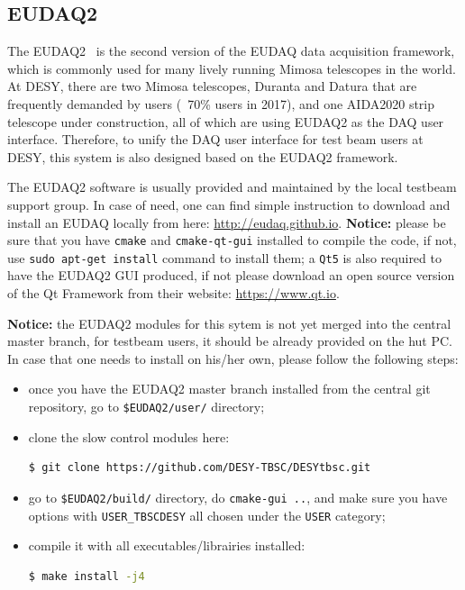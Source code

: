 \documentclass[a4paper,12pt]{scrartcl}
\begin{document}
\subsection{EUDAQ2}
The EUDAQ2~\cite{eudaq2} is the second version of the EUDAQ data acquisition framework, which is commonly used for many lively running Mimosa telescopes in the world. At DESY, there are two Mimosa telescopes, Duranta and Datura that are frequently demanded by users (~70\% users in 2017), and one AIDA2020 strip telescope under construction, all of which are using EUDAQ2 as the DAQ user interface.
Therefore, to unify the DAQ user interface for test beam users at DESY, this system is also designed based on the EUDAQ2 framework.

The EUDAQ2 software is usually provided and maintained by the local testbeam support group. In case of need, one can find simple instruction to download and install an EUDAQ locally from here: \href{http://eudaq.github.io}{http://eudaq.github.io}. \textbf{Notice:} please be sure that you have \verb|cmake| and \verb|cmake-qt-gui| installed to compile the code, if not, use \verb|sudo apt-get install| command to install them; a \texttt{Qt5} is also required to have the EUDAQ2 GUI produced, if not please download an open source version of the Qt Framework from their website: \href{https://www.qt.io}{https://www.qt.io}.

\textbf{Notice:} the EUDAQ2 modules for this sytem is not yet merged into the central master branch, for testbeam users, it should be already provided on the hut PC. In case that one needs to install on his/her own, please follow the following steps:
\begin{itemize}
  \item once you have the EUDAQ2 master branch installed from the central git repository, go to \verb|$EUDAQ2/user/| directory;
  \item clone the slow control modules here:
  \begin{lstlisting}[language=bash]
$ git clone https://github.com/DESY-TBSC/DESYtbsc.git \end{lstlisting}
  \item go to \verb|$EUDAQ2/build/| directory, do \verb|cmake-gui ..|, and make sure you have options with \texttt{USER\_TBSCDESY} all chosen under the \texttt{USER} category;
  \item compile it with all executables/librairies installed:
  \begin{lstlisting}[language=bash]
$ make install -j4  \end{lstlisting}
\end{itemize}
\end{document}
